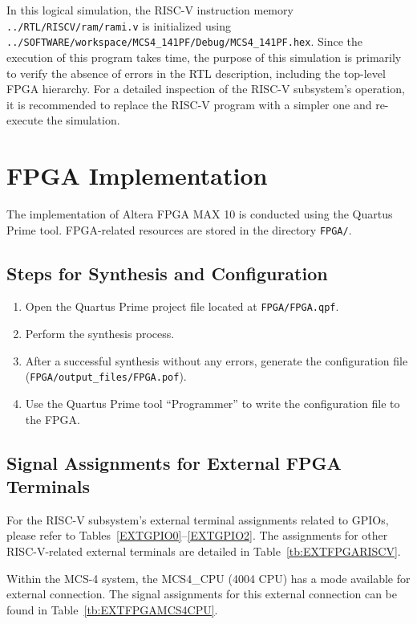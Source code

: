 In this logical simulation, the RISC-V instruction memory \texttt{../RTL/RISCV/ram/rami.v} is initialized using \texttt{../SOFTWARE/workspace/MCS4\_141PF/Debug/MCS4\_141PF.hex}. Since the execution of this program takes time, the purpose of this simulation is primarily to verify the absence of errors in the RTL description, including the top-level FPGA hierarchy. For a detailed inspection of the RISC-V subsystem's operation, it is recommended to replace the RISC-V program with a simpler one and re-execute the simulation.

\section{FPGA Implementation}
The implementation of Altera FPGA MAX 10 is conducted using the Quartus Prime tool. FPGA-related resources are stored in the directory \texttt{FPGA/}.

\subsection*{Steps for Synthesis and Configuration}
\begin{enumerate}
    \item Open the Quartus Prime project file located at \texttt{FPGA/FPGA.qpf}.
    \item Perform the synthesis process.
    \item After a successful synthesis without any errors, generate the configuration file (\texttt{FPGA/output\_files/FPGA.pof}).
    \item Use the Quartus Prime tool ``Programmer'' to write the configuration file to the FPGA.
\end{enumerate}

\subsection{Signal Assignments for External FPGA Terminals}
For the RISC-V subsystem's external terminal assignments related to GPIOs, please refer to Tables~\ref{EXTGPIO0}--\ref{EXTGPIO2}. The assignments for other RISC-V-related external terminals are detailed in Table~\ref{tb:EXTFPGARISCV}.

Within the MCS-4 system, the MCS4\_CPU (4004 CPU) has a mode available for external connection. The signal assignments for this external connection can be found in Table~\ref{tb:EXTFPGAMCS4CPU}.


